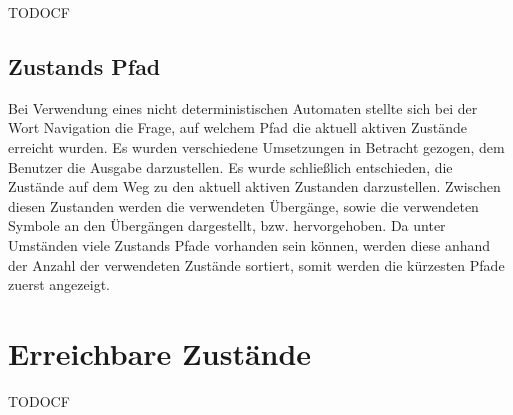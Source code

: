 TODOCF


\subsection{Zustands Pfad}

Bei Verwendung eines nicht deterministischen Automaten stellte sich bei der
Wort Navigation die Frage, auf welchem Pfad die aktuell aktiven Zustände
erreicht wurden. Es wurden verschiedene Umsetzungen in Betracht gezogen, dem
Benutzer die Ausgabe darzustellen. Es wurde schließlich entschieden, die
Zustände auf dem Weg zu den aktuell aktiven Zustanden darzustellen. Zwischen
diesen Zustanden werden die verwendeten Übergänge, sowie die verwendeten
Symbole an den Übergängen dargestellt, bzw. hervorgehoben. Da unter Umständen
viele Zustands Pfade vorhanden sein können, werden diese anhand der Anzahl der
verwendeten Zustände sortiert, somit werden die kürzesten Pfade zuerst
angezeigt.


\section{Erreichbare Zustände}\label{ReachableStates}

TODOCF